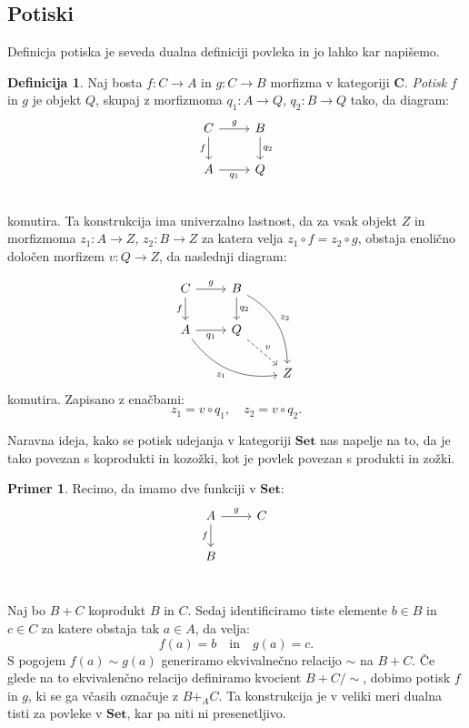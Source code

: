 \documentclass[12pt,a4paper]{book}
\theoremstyle{definition}
\newtheorem{definicija}{Definicija}[chapter]
\theoremstyle{plain}
\theoremstyle{definition}
\newtheorem{primer}{Primer}[section]
\theoremstyle{remark}
\newcommand{\cat}[1]{\textbf{#1}}
\begin{document}
\subsection{Potiski}

Definicja potiska je seveda dualna definiciji povleka in jo lahko kar napišemo.

\begin{definicija}
Naj bosta $f: C \to A$ in $g : C \to B$ morfizma v kategoriji $\cat{C}$. \emph{Potisk} $f$ in $g$ je objekt $Q$, skupaj z morfizmoma $q_1 : A \to Q$, $q_2 : B \to Q$ tako, da diagram:
$$\begin{tikzcd}
C \ar[r, "g"] \ar[d, "f"'] & B \ar[d, "q_2"] \\
A \ar[r, "q_1"'] & Q \\
\end{tikzcd}$$
komutira. Ta konstrukcija ima univerzalno lastnost, da za vsak objekt $Z$ in morfizmoma $z_1 : A \to Z$, $z_2 : B \to Z$ za katera velja $z_1 \circ f = z_2 \circ g$, obstaja enolično določen morfizem $v : Q \to Z$, da naslednji diagram:

$$\begin{tikzcd}
C \ar[r, "g"] \ar[d, "f"'] & B \ar[d, "q_2"] \ar[ddr, bend left, "z_2"] & \\
A \ar[r, "q_1"'] \ar[drr, bend right, "z_1"'] & Q \ar[dr, dashed, "v"] & \\
& & Z 
\end{tikzcd}$$
komutira. Zapisano z enačbami:
$$z_1 = v \circ  q_1, \quad z_2 = v \circ q_2.$$
\end{definicija}

Naravna ideja, kako se potisk udejanja v kategoriji $\cat{Set}$ nas napelje na to, da je tako povezan s koprodukti in kozožki, kot je povlek povezan s produkti in zožki.

\begin{primer}
Recimo, da imamo dve funkciji v $\cat{Set}$:
$$ \begin{tikzcd}
A \ar[d, "f"'] \ar[r, "g"] & C \\
B & \\
\end{tikzcd} $$

Naj bo $B + C$ koprodukt $B$ in $C$. Sedaj identificiramo tiste elemente $b \in B$ in $c \in C$ za katere obstaja tak $a \in A$, da velja:
$$f(a) = b \quad \text{in} \quad g(a) = c.$$
S pogojem $f(a) \sim g(a)$ generiramo ekvivalnečno relacijo $\sim$ na $B + C$. Če glede na to ekvivalenčno relacijo definiramo kvocient $B + C/{\sim}$, dobimo potisk $f$ in $g$, ki se ga včasih označuje z $B +_A C$. Ta konstrukcija je v veliki meri dualna tisti za povleke v $\cat{Set}$, kar pa niti ni presenetljivo.

\end{primer}
\end{document}
